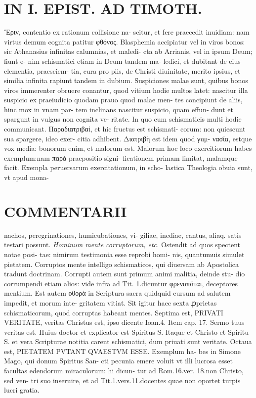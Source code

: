 \documentclass{article}
\begin{document}
\begin{pages}
\section*{IN I. EPIST. AD TIMOTH. }
\marginpar{[ p.153 ]}\pstart Ἔριν, contentio ex rationum collisione na- scitur, et fere praecedit inuidiam: nam virtus demum cognita patitur φθόνος.  \pend\pstart Blasphemia accipiatur vel in viros bonos: sic Athanasius infinitas calumnias, et maledi- cta ab Arrianis, vel in ipsum Deum; fiunt e- nim schismatici etiam in Deum tandem ma- ledici, et dubitant de eius clementia, praesciem- tia, cura pro piis, de Christi diuinitate, merito ipsius, et similia infinita rapiunt tandem in dubium.  \pend\pstart Suspiciones malae sunt, quibus bonos viros immerenter obruere conantur, quod vitium hodie multos latet: nascitur illa suspicio ex praeiudicio quodam prauo quod malae men- tes concipiunt de aliis, hinc mox in vnam par- tem inclinans nascitur suspicio, quam effun- dunt et spargunt in vulgus non cognita ve- ritate. In quo cum schismaticis multi hodie communicant.  \pend\pstart Παραδιατριβαί, et hic fructus est schismati- corum: non quiescunt sua spargere, ideo exer- citia adhibent. Διατριβὴ est idem quod γuμ- νασία, estque vox media: bonorum enim, et malorum est. Malorum hoc loco exercitiorum habes exemplum:nam παρὰ praepositio signi- ficationem primam limitat, malamque facit. Exempla peruersarum exercitationum, in scho- lastica Theologia obuia sunt, vt apud mona-  \pend
\marginpar{[ p.154 ]}
\section*{COMMENTARII }\pstart nachos, peregrinationes, humicubationes, vi- giliae, inediae, cantus, aliaq. satis testari possunt.  \pend
\textit{Hominum mente corruptorum, etc. }\pstart Ostendit ad quos spectent notae posi- tae: nimirum testimonia esse reprobi homi- nis, quantumuis simulet pietatem. Corruptos mente intelligo schismaticos, qui diuersam ab Apostolica tradunt doctrinam. Corrupti autem sunt primum animi malitia, deinde stu- dio corrumpendi etiam alios: vide infra ad Tit. 1.dicuntur φρεναπάται, deceptores mentium.  \pend\pstart Est autem οθορὰ in Scriptura sacra quidquid cursum ad salutem impedit, et morum inte- gritatem vitiat. Sit igitur haec sexta ꝓprietas schismaticorum, quod corruptas habeant mentes.  \pend\pstart Septima est, PRIVATI VERITATE, veritas Christus est, ipso dicente Ioan.4. Item cap. 17. Sermo tuus veritas est. Huius doctor et explicator est Spiritus S. Itaque et Christo et Spiritu S. et vera Scripturae notitia carent schismatici, dum priuati sunt veritate.  \pend\pstart Octaua est, PIETATEM PVTANT QVAESTVM ESSE. Exemplum ha- bes in Simone Mago, qui donum Spiritus San- cti pecunia emere voluit vt illi lucrosa esset facultas edendorum miraculorum: hi dicun- tur ad Rom.16.ver. 18.non Christo, sed ven- tri suo inseruire, et ad Tit.1.vers.11.docentes quae non oportet turpis lucri gratia.  \pend

\end{pages}
\end{document}
